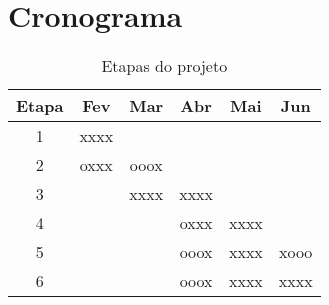 \section{Cronograma}

\begin{table}
\caption{Etapas do projeto}
\centering
\begin{tabular}{c c c c c c}
Etapa & Fev & Mar & Abr & Mai & Jun \\
\hline
1 & xxxx & & & & \\
2 & oxxx & ooox & & & \\
3 & & xxxx & xxxx & & \\
4 & && oxxx & xxxx & \\
5 & & & ooox & xxxx & xooo \\
6 & & & ooox & xxxx & xxxx \\
\hline
\end{tabular}
\end{table}
